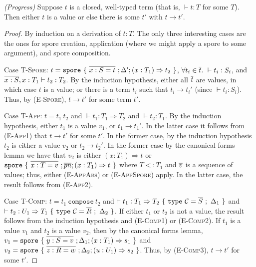 \begin{theorem}
\emph{(Progress)}
\label{th:progress}
Suppose $t$ is a closed, well-typed term (that is, $\vdash t : T$ for some $T$). Then either $t$ is a value or else there is some $t'$ with $t \rightarrow t'$.
\end{theorem}
\begin{proof}
By induction on a derivation of $t : T$. The only three interesting cases are the ones for spore creation, application (where we might apply a spore to some argument), and spore composition.

Case \textsc{T-Spore}: $t = \texttt{spore}~\{~\overline{x : S = t}~; \Delta'; (x: T_1) \Rightarrow t_2~\}$, $\forall t_i \in \overline{t}.~\vdash t_i : S_i$, and $\overline{x : S}, x : T_1 \vdash t_2 : T_2$. By the induction hypothesis, either all $\overline{t}$ are values, in which case $t$ is a value; or there is a term $t_i$ such that $t_i \rightarrow t_i'$ (since $\vdash t_i : S_i$). Thus, by (\textsc{E-Spore}), $t \rightarrow t'$ for some term $t'$.

Case \textsc{T-App}: $t = t_1~t_2$ and $\vdash t_1 : T_1 \Rightarrow T_2$ and $\vdash t_2 : T_1$. By the induction hypothesis, either $t_1$ is a value $v_1$, or $t_1 \rightarrow t_1'$. In the latter case it follows from (\textsc{E-App1}) that $t \rightarrow t'$ for some $t'$. In the former case, by the induction hypothesis $t_2$ is either a value $v_2$ or $t_2 \rightarrow t_2'$. In the former case by the canonical forms lemma we have that $v_2$ is either $(x: T_1) \Rightarrow t$ or $\texttt{spore}~\{~\overline{x : T = v}~; \overline{pn} ; (x: T_1) \Rightarrow t~\}$ where $T <: T_1$ and $\overline{v}$ is a sequence of values; thus, either (\textsc{E-AppAbs}) or (\textsc{E-AppSpore}) apply. In the latter case, the result follows from (\textsc{E-App2}).

Case \textsc{T-Comp}: $t = t_1~\texttt{compose}~t_2$ and $\vdash t_1 : T_1 \Rightarrow T_2~\{~\texttt{type}~\mathcal{C} = \overline{S}~;~\Delta_1~\}$ and $\vdash t_2 : U_1 \Rightarrow T_1~\{~\texttt{type}~\mathcal{C} = \overline{R}~;~\Delta_2~\}$. If either $t_1$ or $t_2$ is not a value, the result follows from the induction hypothesis and (\textsc{E-Comp1}) or (\textsc{E-Comp2}). If $t_1$ is a value $v_1$ and $t_2$ is a value $v_2$, then by the canonical forms lemma, $v_1 = \texttt{spore}~\{~\overline{y : S = v}~; \Delta_1; (x: T_1) \Rightarrow s_1~\}$ and $v_2 = \texttt{spore}~\{~\overline{z : R = w}~; \Delta_2; (u: U_1) \Rightarrow s_2~\}$. Thus, by (\textsc{E-Comp3}), $t \rightarrow t'$ for some $t'$.

\end{proof}


